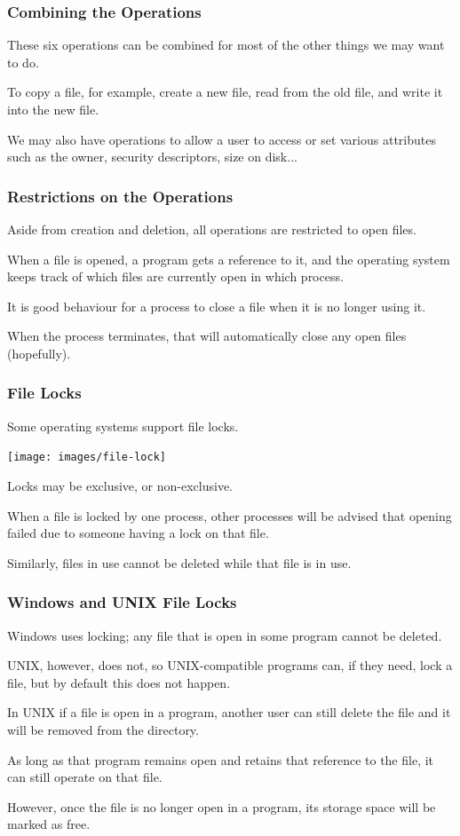 \begin{frame}
	\frametitle{Combining the Operations}

	These six operations can be combined for most of the other things we may want to do.

	To copy a file, for example, create a new file, read from the old file, and write it into the new file.

	We may also have operations to allow a user to access or set various attributes such as the owner, security descriptors, size on disk...

\end{frame}

\begin{frame}
	\frametitle{Restrictions on the Operations}

	Aside from creation and deletion, all operations are restricted to open files.

	When a file is opened, a program gets a reference to it, and the operating system keeps track of which files are currently open in which process.

	It is good behaviour for a process to close a file when it is no longer using it.

	When the process terminates, that will automatically close any open files (hopefully).

\end{frame}

\begin{frame}
	\frametitle{File Locks}

	Some operating systems support file locks.

	\begin{center}
		\texttt{[image: images/file-lock]}
	\end{center}

	Locks may be exclusive, or non-exclusive.

	When a file is locked by one process, other processes will be advised that opening failed due to someone having a lock on that file.

	Similarly, files in use cannot be deleted while that file is in use.

\end{frame}

\begin{frame}
	\frametitle{Windows and UNIX File Locks}

	Windows uses locking; any file that is open in some program cannot be deleted.

	UNIX, however, does not, so UNIX-compatible programs can, if they need, lock a file, but by default this does not happen.

	In UNIX if a file is open in a program, another user can still delete the file and it will be removed from the directory.

	As long as that program remains open and retains that reference to the file, it can still operate on that file.

	However, once the file is no longer open in a program, its storage space will be marked as free.

\end{frame}


